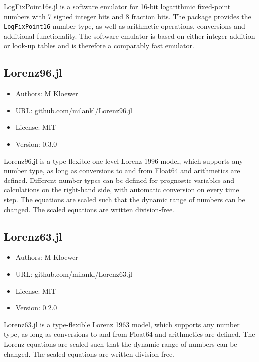 LogFixPoint16s.jl is a software emulator for 16-bit logarithmic fixed-point numbers with 7 signed integer bits and 8 fraction bits. The package provides the \texttt{LogFixPoint16} number type, as well as arithmetic operations, conversions and additional functionality. The software emulator is based on either integer addition or look-up tables and is therefore a comparably fast emulator.

\subsection{Lorenz96.jl}

\begin{itemize}
    \setlength\itemsep{-5pt}
    \item Authors: M Kloewer
    \item URL: github.com/milankl/Lorenz96.jl
    \item License: MIT
    \item Version: 0.3.0
\end{itemize}

Lorenz96.jl is a type-flexible one-level Lorenz 1996 model, which supports any number type, as long as conversions to and from Float64 and arithmetics are defined. Different number types can be defined for prognostic variables and calculations on the right-hand side, with automatic conversion on every time step. The equations are scaled such that the dynamic range of numbers can be changed. The scaled equations are written division-free.

\subsection{Lorenz63.jl}

\begin{itemize}
    \setlength\itemsep{-5pt}
    \item Authors: M Kloewer
    \item URL: github.com/milankl/Lorenz63.jl
    \item License: MIT
    \item Version: 0.2.0
\end{itemize}

Lorenz63.jl is a type-flexible Lorenz 1963 model, which supports any number type, as long as conversions to and from Float64 and arithmetics are defined. The Lorenz equations are scaled such that the dynamic range of numbers can be changed. The scaled equations are written division-free.

